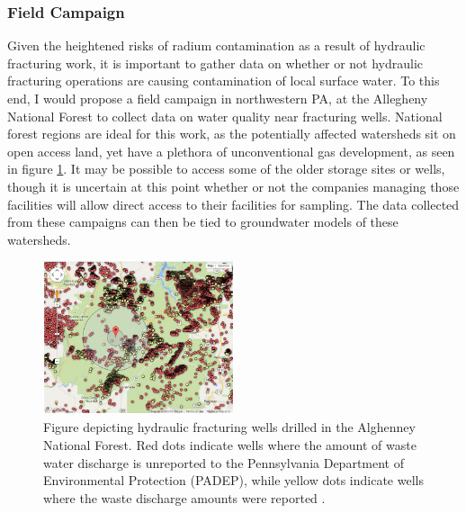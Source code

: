 \documentclass[twoside,12pt,titlepage]{article}
\begin{document}
\subsubsection{Field Campaign}
\label{sec:RaField}
Given the heightened risks of radium contamination as a result of hydraulic fracturing work, it is important to gather data on whether or not hydraulic fracturing operations are causing contamination of local surface water. To this end, I would propose a field campaign in northwestern PA, at the Allegheny National Forest to collect data on water quality near fracturing wells. National forest regions are ideal for this work, as the potentially affected watersheds sit on open access land, yet have a plethora of unconventional gas development, as seen in figure \ref{fig:NationalForest}. It may be possible to access some of the older storage sites or wells, though it is uncertain at this point whether or not the companies managing those facilities will allow direct access to their facilities for sampling. The data collected from these campaigns can then be tied to groundwater models of these watersheds.

\begin{figure}
	\centering
	\includegraphics[width=0.5\textwidth]{AlghenneyForestFrackingWells.jpg}
	\caption{Figure depicting hydraulic fracturing wells drilled in the Alghenney National Forest. Red dots indicate wells where the amount of waste water discharge is unreported to the Pennsylvania Department of Environmental Protection (PADEP), while yellow dots indicate wells where the waste discharge amounts were reported \cite{NRDCFrackingMap}.}
	\label{fig:NationalForest}
\end{figure}
\end{document}
